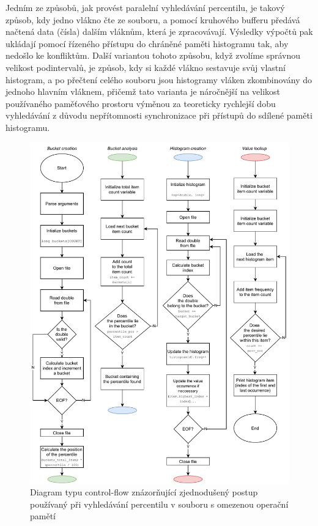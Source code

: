 \documentclass[12pt, a4paper]{article}
\begin{document}
Jedním ze způsobů, jak provést paralelní vyhledávání percentilu, je takový způsob, kdy jedno vlákno čte ze souboru, a pomocí kruhového bufferu předává načtená data (čísla) dalším vláknům, která je zpracovávají. Výsledky výpočtů pak ukládají pomocí řízeného přístupu do chráněné paměti histogramu tak, aby nedošlo ke konfliktům. 
Další variantou tohoto způsobu, když zvolíme správnou velikost podintervalů, je způsob, kdy si každé vlákno sestavuje svůj vlastní histogram, a po přečtení celého souboru jsou histogramy vláken zkombinovány do jednoho hlavním vláknem, přičemž tato varianta je náročnější na velikost používaného paměťového prostoru výměnou za teoreticky rychlejší dobu vyhledávání z důvodu nepřítomnosti synchronizace při přístupů do sdílené paměti histogramu.

\begin{figure}[!ht]
    \centering 
    \includegraphics[width=1.038125\textwidth]{pdf/cfd.pdf}
    \caption{Diagram typu control-flow znázorňující zjednodušený postup používaný při vyhledávání percentilu v souboru s omezenou operační pamětí}
\end{figure}
\end{document}
